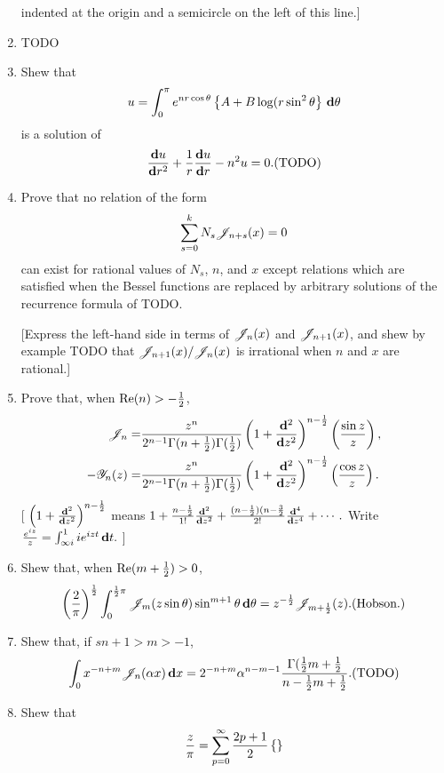 \documentclass{book}
\begin{document}
\begin{enumerate}
  indented at the origin and a semicircle on the left of this line.]
\item
  TODO
\item
  Shew that
  $$
  u = \int_{0}^{\pi} e^{nr\cos\theta} \left\{ A + B \log(r\sin^{2}\theta \right\} \, \mathbf{d} \theta
  $$
  is a solution of
  $$
  \frac{\dd u}{\dd r^{2}} + \frac{1}{r} \frac{\dd u}{\dd r} - n^{2} u
  = 0.
  \addexamplecitation{TODO}
  $$
\item
  Prove that no relation of the form
  $$
  \sum_{s=0}^{k} N_{s} \mathscr{J}_{n+s}(x) = 0
  $$
  can exist for rational values of $N_{s}$, $n$, and $x$ except
  relations which are satisfied when the Bessel functions are replaced
  by arbitrary solutions of the recurrence formula of TODO.

  [Express the left-hand side in terms of $\mathscr{J}_{n}(x)$ and
  $\mathscr{J}_{n+1}(x)$, and shew by example TODO that
  $\mathscr{J}_{n+1}(x)/\mathscr{J}_{n}(x)$ is irrational when $n$ and $x$ are
  rational.]
\item
  Prove that, when $\mathrm{Re}(n) > -\frac{1}{2}$,
  \begin{align*}
    \mathscr{J}_{n} 
    =&
    \frac{z^{n}}{2^{n-1}\Gamma(n+\frac{1}{2}) \Gamma(\frac{1}{2})}
    \left( 1 + \frac{\mathbf{d}^{2}}{\mathbf{d} z^{2}} \right)^{n-\frac{1}{2}}
    \left(  \frac{\sin z}{z}  \right),
    \\
    -\mathscr{Y}_{n}(z)
    =&
    \frac{z^{n}}{2^{n-1}\Gamma(n+\frac{1}{2}) \Gamma(\frac{1}{2})}
    \left( 1 + \frac{\mathbf{d}^{2}}{\mathbf{d} z^{2}} \right)^{n-\frac{1}{2}}
    \left(  \frac{\cos z}{z}  \right).
  \end{align*}
  [
  $\left( 1 + \frac{\mathbf{d}^{2}}{\mathbf{d} z^{2}} \right)^{n-\frac{1}{2}}$
  means
  $ 1
  + \frac{n-\frac{1}{2}}{1!} \frac{\mathbf{d}^{2}}{\mathbf{d} z^{2}}
  + \frac{ (n-\frac{1}{2}) (n- \frac{3}{2}}{2!} \frac{\mathbf{d}^{4}}{\mathbf{d} z^{4}}
  + \cdots .
  $
  Write
  $ \frac{e^{iz}}{z} = \int_{\infty i}^{1} i e^{izt} \, \mathbf{d} t. $
  ]
\item
  Shew that, when $\mathrm{Re}(m+\frac{1}{2})>0$,
  $$
  \theparen{
    \frac{2}{\pi}
  }^{\half}
  \int_{0}^{\half\pi}
  \besJ_{m}(z \sin\theta)
  \sin^{m+1}\theta
  \dmeasure \theta
  =
  z^{-\half} \besJ_{m+\half}(z).
  \addexamplecitation{Hobson.}
  $$
\item
  Shew that, if $sn+1 > m > -1$,
  $$
  \int_{0} x^{-n+m} \besJ_{n}(\alpha x) \dmeasure x
  =
  2^{-n+m} \alpha^{n-m-1}
  \frac{\Gamma(\half m + \half}{n - \half m + \half}.
  \addexamplecitation{TODO}
  $$
\item
  Shew that
  $$
  \frac{z}{\pi}
  =
  \sum_{p=0}^{\infty} \frac{2p+1}{2} \left\{ 
 \right\}$$
\end{enumerate}
\end{document}
